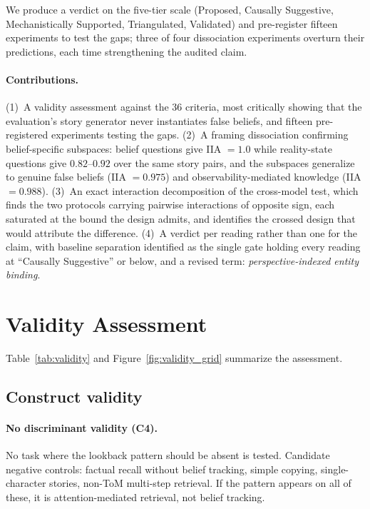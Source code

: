 \documentclass{article}
\begin{document}
We produce a verdict on the five-tier scale (Proposed, Causally Suggestive, Mechanistically Supported, Triangulated, Validated) and pre-register fifteen experiments to test the gaps; three of four dissociation experiments overturn their predictions, each time strengthening the audited claim.

\paragraph{Contributions.}
(1)~A validity assessment against the 36 criteria, most critically showing that the evaluation's story generator never instantiates false beliefs, and fifteen pre-registered experiments testing the gaps.
(2)~A framing dissociation confirming belief-specific subspaces: belief questions give IIA $= 1.0$ while reality-state questions give $0.82$--$0.92$ over the same story pairs, and the subspaces generalize to genuine false beliefs (IIA $= 0.975$) and observability-mediated knowledge (IIA $= 0.988$).
(3)~An exact interaction decomposition of the cross-model test, which finds the two protocols carrying pairwise interactions of opposite sign, each saturated at the bound the design admits, and identifies the crossed design that would attribute the difference.
(4)~A verdict per reading rather than one for the claim, with baseline separation identified as the single gate holding every reading at ``Causally Suggestive'' or below, and a revised term: \emph{perspective-indexed entity binding}.


\section{Validity Assessment}
\label{sec:validity}

Table~\ref{tab:validity} and Figure~\ref{fig:validity_grid} summarize the assessment.

\subsection{Construct validity}

\paragraph{No discriminant validity (C4).}
No task where the lookback pattern should be absent is tested. Candidate negative controls: factual recall without belief tracking, simple copying, single-character stories, non-ToM multi-step retrieval. If the pattern appears on all of these, it is attention-mediated retrieval, not belief tracking.
\end{document}
